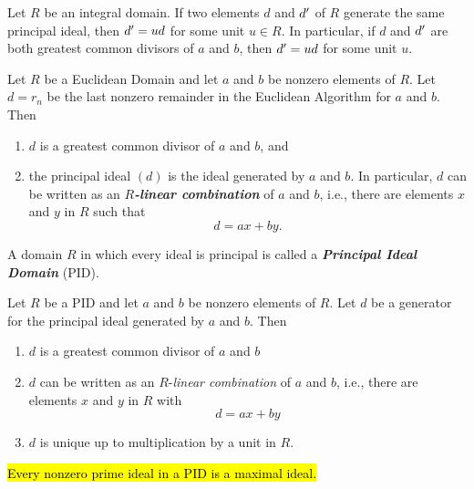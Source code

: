\nl

\begin{prop}
Let $R$ be an integral domain. If two elements $d$ and $d^\prime$ of $R$ generate the same principal ideal, then $d^\prime = ud$ for some unit $u\in R$. In particular, if $d$ and $d^\prime$ are both greatest common divisors of $a$ and $b$, then $d^\prime = ud$ for some unit $u$.
\end{prop}

\nl

\begin{thm}
Let $R$ be a Euclidean Domain and let $a$ and $b$ be nonzero elements of $R$. Let $d = r_n$ be the last nonzero remainder in the Euclidean Algorithm for $a$ and $b$. Then
\begin{enumerate}
\item $d$ is a greatest common divisor of $a$ and $b$, and 
\item the principal ideal $(d)$ is the ideal generated by $a$ and $b$. In particular, $d$ can be written as an $R$\textbf{\textit{-linear combination}} of $a$ and $b$, i.e., there are elements $x$ and $y$ in $R$ such that 
\[d = ax + by.\]
\end{enumerate}
\end{thm}

\nl

\begin{defn}
A domain $R$ in which every ideal is principal is called a \textbf{\textit{Principal Ideal Domain}} (PID).
\end{defn}

\nl

\begin{prop}
Let $R$ be a PID and let $a$ and $b$ be nonzero elements of $R$. Let $d$ be a generator for the principal ideal generated by $a$ and $b$. Then
\begin{enumerate}
\item $d$ is a greatest common divisor of $a$ and $b$
\item $d$ can be written as an $R$-\textit{linear combination} of $a$ and $b$, i.e., there are elements $x$ and $y$ in $R$ with 
\[d = ax + by\]
\item $d$ is unique up to multiplication by a unit in $R$.
\end{enumerate}
\end{prop}

\nl

\begin{prop}
\hl{Every nonzero prime ideal in a PID is a maximal ideal.} 
\end{prop}

